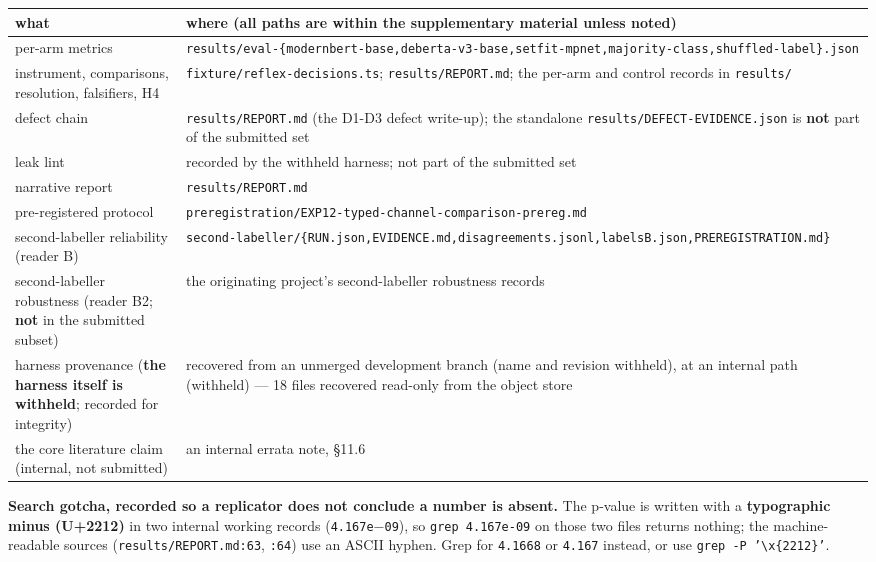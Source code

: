 \documentclass[10pt]{article}
\begin{document}
\begin{center}
\begin{tabular}{@{}>{\raggedright\arraybackslash}p{}>{\raggedright\arraybackslash}p{}@{}}
\hline
\textbf{what} & \textbf{where (all paths are within the supplementary material unless noted)} \\ \hline
per-arm metrics & \texttt{results/eval-\{modernbert-base,deberta-v3-base,setfit-mpnet,majority-class,shuffled-label\}.json} \\ \hline
instrument, comparisons, resolution, falsifiers, H4 & \texttt{fixture/reflex-decisions.ts}; \texttt{results/REPORT.md}; the per-arm and control records in \texttt{results/} \\ \hline
defect chain & \texttt{results/REPORT.md} (the D1-D3 defect write-up); the standalone \texttt{results/DEFECT-EVIDENCE.json} is \textbf{not} part of the submitted set \\ \hline
leak lint & recorded by the withheld harness; not part of the submitted set \\ \hline
narrative report & \texttt{results/REPORT.md} \\ \hline
pre-registered protocol & \texttt{preregistration/EXP12-typed-channel-comparison-prereg.md} \\ \hline
second-labeller reliability (reader B) & \texttt{second-labeller/\{RUN.json,EVIDENCE.md,disagreements.jsonl,labelsB.json,PREREGISTRATION.md\}} \\ \hline
second-labeller robustness (reader B2; \textbf{not} in the submitted subset) & the originating project's second-labeller robustness records \\ \hline
harness provenance (\textbf{the harness itself is withheld}; recorded for integrity) & recovered from an unmerged development branch (name and revision withheld), at an internal path (withheld) --- 18 files recovered read-only from the object store \\ \hline
the core literature claim (internal, not submitted) & an internal errata note, \S11.6\cite{source_corpus_errata_2026} \\ \hline
\end{tabular}
\end{center}

\textbf{Search gotcha, recorded so a replicator does not conclude a number is absent.} The p-value is written with a \textbf{typographic minus (U+2212)} in two internal working records (\texttt{4.167e$-$09}), so \texttt{grep 4.167e-09} on those two files returns nothing; the machine-readable sources (\texttt{results/REPORT.md:63}, \texttt{:64}) use an ASCII hyphen. Grep for \texttt{4.1668} or \texttt{4.167} instead, or use \texttt{grep -P '\textbackslash{}x\{2212\}'}.
\end{document}
